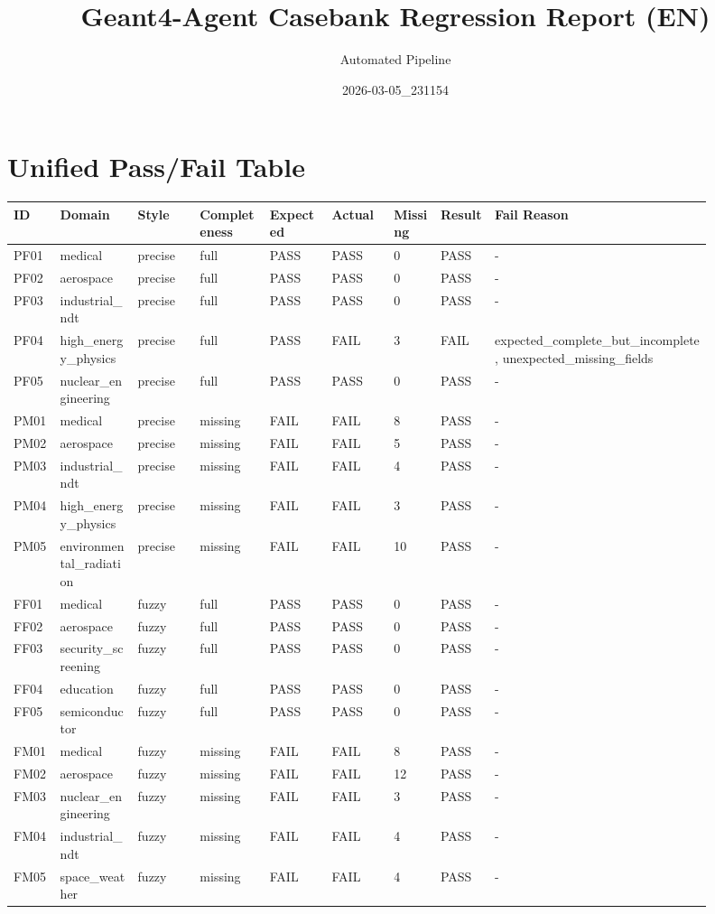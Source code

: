 \documentclass[11pt]{ctexart}
\title{Geant4-Agent Casebank Regression Report (EN)}
\author{Automated Pipeline}
\date{2026-03-05\_231154}
\begin{document}
\maketitle
\section{Unified Pass/Fail Table}
\begin{longtable}{p{0.06\linewidth}p{0.1\linewidth}p{0.08\linewidth}p{0.09\linewidth}p{0.08\linewidth}p{0.08\linewidth}p{0.06\linewidth}p{0.07\linewidth}p{0.28\linewidth}}
\toprule
ID & Domain & Style & Completeness & Expected & Actual & Missing & Result & Fail Reason \\
\midrule
PF01 & medical & precise & full & PASS & PASS & 0 & PASS & - \\
PF02 & aerospace & precise & full & PASS & PASS & 0 & PASS & - \\
PF03 & industrial\_ndt & precise & full & PASS & PASS & 0 & PASS & - \\
PF04 & high\_energy\_physics & precise & full & PASS & FAIL & 3 & FAIL & expected\_complete\_but\_incomplete, unexpected\_missing\_fields \\
PF05 & nuclear\_engineering & precise & full & PASS & PASS & 0 & PASS & - \\
PM01 & medical & precise & missing & FAIL & FAIL & 8 & PASS & - \\
PM02 & aerospace & precise & missing & FAIL & FAIL & 5 & PASS & - \\
PM03 & industrial\_ndt & precise & missing & FAIL & FAIL & 4 & PASS & - \\
PM04 & high\_energy\_physics & precise & missing & FAIL & FAIL & 3 & PASS & - \\
PM05 & environmental\_radiation & precise & missing & FAIL & FAIL & 10 & PASS & - \\
FF01 & medical & fuzzy & full & PASS & PASS & 0 & PASS & - \\
FF02 & aerospace & fuzzy & full & PASS & PASS & 0 & PASS & - \\
FF03 & security\_screening & fuzzy & full & PASS & PASS & 0 & PASS & - \\
FF04 & education & fuzzy & full & PASS & PASS & 0 & PASS & - \\
FF05 & semiconductor & fuzzy & full & PASS & PASS & 0 & PASS & - \\
FM01 & medical & fuzzy & missing & FAIL & FAIL & 8 & PASS & - \\
FM02 & aerospace & fuzzy & missing & FAIL & FAIL & 12 & PASS & - \\
FM03 & nuclear\_engineering & fuzzy & missing & FAIL & FAIL & 3 & PASS & - \\
FM04 & industrial\_ndt & fuzzy & missing & FAIL & FAIL & 4 & PASS & - \\
FM05 & space\_weather & fuzzy & missing & FAIL & FAIL & 4 & PASS & - \\
\bottomrule
\end{longtable}
\end{document}
